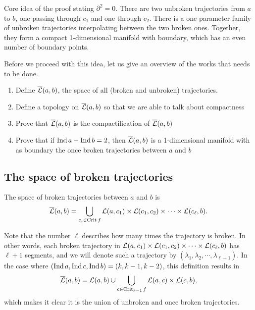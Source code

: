 \begin{marginfigure}
    \centering
    \caption{
        Core idea of the proof stating $\partial^2 = 0$.
        There are two unbroken trajectories from $a$ to $b$, one passing through $c_1$ and one through $c_2$.
        There is a one parameter family of unbroken trajectories interpolating between the two broken ones.
        Together, they form a compact 1-dimensional manifold with boundary, which has an even number of boundary points.
    }
    \label{fig:morse-complex-is-a-complex-idea-of-proof}
\end{marginfigure}

Before we proceed with this idea, let us give an overview of the works that needs to be done.

\begin{enumerate}
    \item Define $\overline{\mathcal L}(a, b)$, the space of all (broken and unbroken) trajectories.
    \item Define a topology on $\overline{\mathcal L}(a, b)$ so that we are able to talk about compactness
    \item Prove that  $\overline{\mathcal L}(a, b)$ is the compactification of $\overline{\mathcal L}(a, b)$
    \item Prove that if $\operatorname{Ind} a - \operatorname{Ind} b = 2$, then $\overline{\mathcal L}(a, b)$ is a 1-dimensional manifold with as boundary the once broken trajectories between $a$ and  $b$
\end{enumerate}

\subsection{The space of broken trajectories}
\begin{definition}
    The space of broken trajectories between $a$ and  $b$ is
     \[
         \overline{\mathcal L}(a, b) = \bigcup_{c_i \in \operatorname{Crit} f} \mathcal L(a, c_1) \times \mathcal L(c_1, c_2) \times  \cdots \times \mathcal L(c_\ell, b)
    .\] 
\end{definition}

    Note that the number $\ell$ describes how many times the trajectory is broken.
    In other words, each broken trajectory in $\mathcal L(a, c_1) \times \mathcal L(c_1, c_2) \times  \cdots \times \mathcal L(c_\ell, b)$ has $ \ell+1$ segments,  and we will denote such a trajectory by $(\lambda_1, \lambda_2, \cdots, \lambda_{\ell+1})$.
    In the case where $(\operatorname{Ind} a, \operatorname{Ind} c, \operatorname{Ind} b) = (k, k-1, k-2)$, this definition results in
    \[
        \overline{\mathcal L}(a, b) = \mathcal L(a, b) \cup  \bigcup_{c \in \operatorname{Crit}_{k-1} f}  \mathcal L(a, c) \times \mathcal L(c, b)
    ,\] 
    which makes it clear it is the union of unbroken and once broken trajectories.

